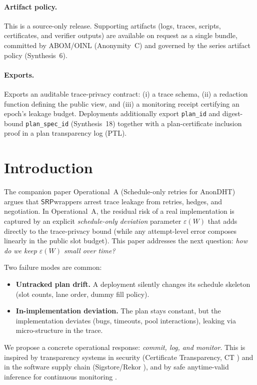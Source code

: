 \documentclass[11pt]{article}
\newcommand{\SRP}{\ensuremath{\mathsf{SRP}}}
\begin{document}
\paragraph{Artifact policy.}
This is a source-only release. Supporting artifacts (logs, traces, scripts, certificates, and verifier outputs) are available on request as a single bundle, committed by ABOM/OINL (Anonymity~C) and governed by the series artifact policy (Synthesis~6).\cite{series:artifactpolicy}

\paragraph{Exports.}
Exports an auditable trace-privacy contract: (i) a trace schema, (ii) a redaction function defining the public view, and (iii) a monitoring receipt certifying an epoch's leakage budget.
Deployments additionally export \texttt{plan\_id} and digest-bound \texttt{plan\_spec\_id} (Synthesis~18) together with a plan-certificate inclusion proof in a plan transparency log (PTL).\cite{series:planstateequiv}

\section{Introduction}

The companion paper Operational~A (Schedule-only retries for AnonDHT) argues that \SRP wrappers arrest trace leakage from retries, hedges, and negotiation.\cite{series:operationalA}
In Operational~A, the residual risk of a real implementation is captured by an explicit \emph{schedule-only deviation} parameter $\varepsilon(W)$ that adds directly to the trace-privacy bound (while any attempt-level error composes linearly in the public slot budget).
This paper addresses the next question: \emph{how do we keep $\varepsilon(W)$ small over time?}

Two failure modes are common:
\begin{itemize}[leftmargin=*]
  \item \textbf{Untracked plan drift.} A deployment silently changes its schedule skeleton (slot counts, lane order, dummy fill policy).
  \item \textbf{In-implementation deviation.} The plan stays constant, but the implementation deviates (bugs, timeouts, pool interactions),
        leaking via micro-structure in the trace.
\end{itemize}

We propose a concrete operational response: \emph{commit, log, and monitor}.
This is inspired by transparency systems in security (Certificate Transparency, CT \cite{rfc6962,rfc9162})
and in the software supply chain (Sigstore/Rekor \cite{newmanSigstore2022,rekorDocs}),
and by safe anytime-valid inference for continuous monitoring \cite{ramdasSAVIStatSci2023,shaferTestingByBetting,ramdasEvaluesEbook2025,lySAVITutorial2025}.
\end{document}

